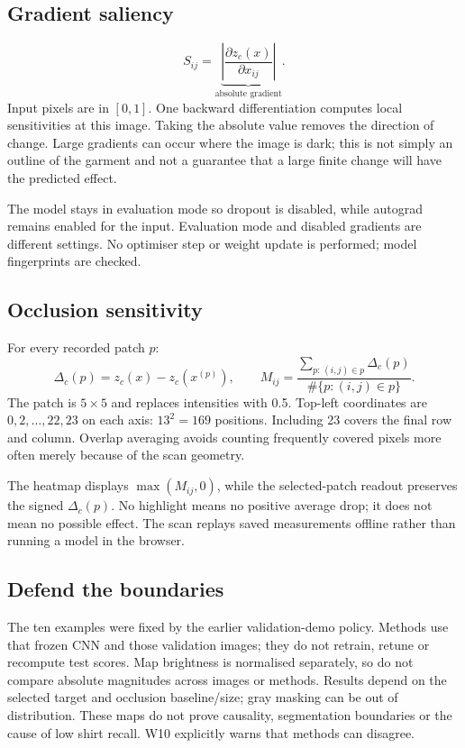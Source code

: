 \documentclass[11pt,a4paper]{article}
\begin{document}
\subsection{Gradient saliency}
\[
S_{ij}=\underbrace{\left\lvert\frac{\partial z_c(x)}{\partial x_{ij}}\right\rvert}_{\text{absolute gradient}}.
\]
Input pixels are in $[0,1]$. One backward differentiation computes local sensitivities at this image. Taking the absolute value removes the direction of change. Large gradients can occur where the image is dark; this is not simply an outline of the garment and not a guarantee that a large finite change will have the predicted effect.

The model stays in evaluation mode so dropout is disabled, while autograd remains enabled for the input. Evaluation mode and disabled gradients are different settings. No optimiser step or weight update is performed; model fingerprints are checked.
\subsection{Occlusion sensitivity}
For every recorded patch $p$:
\[
\Delta_c(p)=z_c(x)-z_c(x^{(p)}),\qquad
M_{ij}=\frac{\sum_{p:\,(i,j)\in p}\Delta_c(p)}{\#\{p:(i,j)\in p\}}.
\]
The patch is $5\times5$ and replaces intensities with 0.5. Top-left coordinates are $0,2,\ldots,22,23$ on each axis: $13^2=169$ positions. Including 23 covers the final row and column. Overlap averaging avoids counting frequently covered pixels more often merely because of the scan geometry.

The heatmap displays $\max(M_{ij},0)$, while the selected-patch readout preserves the signed $\Delta_c(p)$. No highlight means no positive average drop; it does not mean no possible effect. The scan replays saved measurements offline rather than running a model in the browser.
\subsection{Defend the boundaries}
The ten examples were fixed by the earlier validation-demo policy. Methods use that frozen CNN and those validation images; they do not retrain, retune or recompute test scores. Map brightness is normalised separately, so do not compare absolute magnitudes across images or methods. Results depend on the selected target and occlusion baseline/size; gray masking can be out of distribution. These maps do not prove causality, segmentation boundaries or the cause of low shirt recall. W10 explicitly warns that methods can disagree.
\end{document}
